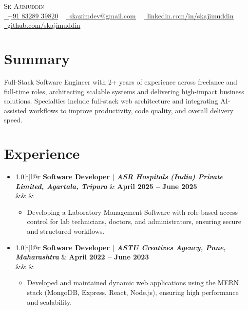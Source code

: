 \documentclass[letterpaper,11pt]{article}
\makeatletter
\newcommand{\resumeItem}[1]{\item\small{{#1 \vspace{-2pt}}}}
\newcommand{\resumeSubheading}[4]{
  \vspace{-2pt}\item
    \begin{tabular*}{1.0\textwidth}[t]{l@{\extracolsep{\fill}}r}
      \textbf{#1} & \textbf{\small #2} \\
      \ifx&#3&%
      \else
        \textit{\small #3} & \textit{\small #4} \\
      \fi
    \end{tabular*}\vspace{-6pt}
}
\newcommand{\resumeItemListStart}{\begin{itemize}}
\newcommand{\resumeItemListEnd}{\end{itemize}\vspace{-5pt}}
\newcommand{\resumeSubHeadingListStart}{\begin{itemize}[leftmargin=0.0in, label={}]}
\newcommand{\resumeSubHeadingListEnd}{\end{itemize}}
\makeatother
\begin{document}
\begin{center}
  {\Huge \scshape Sk Ajimuddin} \\ \vspace{4pt}
  \small
  \href{tel:+918328939820}{\faPhone\ \underline{+91 83289 39820}} ~
  \href{mailto:skazimdev@gmail.com}{\faEnvelope\ \underline{skazimdev@gmail.com}} ~
  \href{https://www.linkedin.com/in/skajimuddin/}{\faLinkedin\ \underline{linkedin.com/in/skajimuddin}} ~
  \href{https://github.com/skajimuddin}{\faGithub\ \underline{github.com/skajimuddin}}
\end{center}

\section{Summary}
Full-Stack Software Engineer with 2+ years of experience across freelance and full-time roles, architecting scalable systems and delivering high-impact business solutions. Specialties include full-stack web architecture and integrating AI-assisted workflows to improve productivity, code quality, and overall delivery speed.

\section{Experience}
\resumeSubHeadingListStart
  \resumeSubheading
    {\textbf{Software Developer} $|$ {\normalfont\textit{ASR Hospitals (India) Private Limited, Agartala, Tripura}}}{April 2025 -- June 2025}
    {}{}
    \resumeItemListStart
      \resumeItem{Developing a Laboratory Management Software with role-based access control for lab technicians, doctors, and administrators, ensuring secure and structured workflows.}
    \resumeItemListEnd
  \resumeSubheading
    {\textbf{Software Developer} $|$ {\normalfont\textit{ASTU Creatives Agency, Pune, Maharashtra}}}{April 2022 -- June 2023}
    {}{}
    \resumeItemListStart
      \resumeItem{Developed and maintained dynamic web applications using the MERN stack (MongoDB, Express, React, Node.js), ensuring high performance and scalability.}
    \resumeItemListEnd
\resumeSubHeadingListEnd

\end{document}

